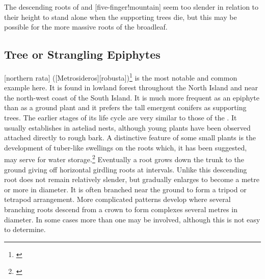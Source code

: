 The descending roots of  and [five-finger!mountain] seem too slender in relation to their height to stand alone when the supporting trees die, but this may be possible for the more massive roots of the broadleaf.

\subsection{Tree or Strangling Epiphytes}

[northern rata] ([Metrosideros][robusta])\footnote{\cite{dawson1967growth}} is the most notable and common example here.
It is found in lowland forest throughout the North Island and near the north-west coast of the South Island.
It is much more frequent as an epiphyte than as a ground plant and it prefers the tall emergent conifers as supporting trees.
The earlier stages of its life cycle are very similar to those of the .
It usually establishes in asteliad nests, although young plants have been observed attached directly to rough bark.
A distinctive feature of some small  plants is the development of tuber-like swellings on the roots which, it has been suggested, may serve for water storage.\footnote{\cite{beddie1953root}}
Eventually a root grows down the trunk to the ground giving off horizontal girdling roots at intervals.
Unlike  this descending root does not remain relatively slender, but gradually enlarges to become a metre or more in diameter.
It is often branched near the ground to form a tripod or tetrapod arrangement.
More complicated patterns develop where several branching roots descend from a  crown to form complexes several metres in diameter.
In some cases more than one  may be involved, although this is not easy to determine.

